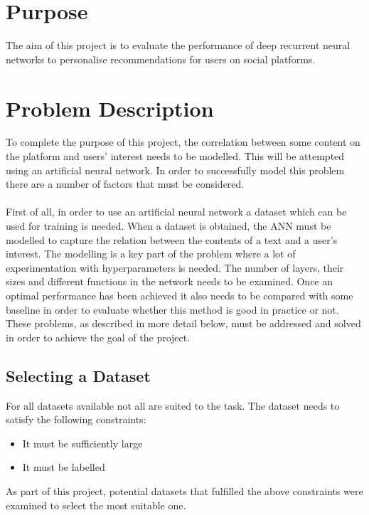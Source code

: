 \section{Purpose}
The aim of this project is to evaluate the performance of deep recurrent neural networks to personalise recommendations for users on social platforms.

\section{Problem Description}
To complete the purpose of this project, the correlation between some content on the platform and users' interest needs to be modelled. This will be attempted using an artificial neural network. In order to successfully model this problem there are a number of factors that must be considered.
\\\\
First of all, in order to use an artificial neural network a dataset which can be used for training is needed. When a dataset is obtained, the ANN must be modelled to capture the relation between the contents of a text and a user's interest. The modelling is a key part of the problem where a lot of experimentation with hyperparameters is needed. The number of layers, their sizes and different functions in the network needs to be examined. Once an optimal performance has been achieved it also needs to be compared with some baseline in order to evaluate whether this method is good in practice or not. These problems, as described in more detail below,  must be addressed and solved in order to achieve the goal of the project.

\subsection{Selecting a Dataset}\label{sec:select_dataset}
For all datasets available not all are suited to the task. The dataset needs to satisfy the following constraints: 
\vspace*{0.25cm}
\begin{itemize}
    \item It must be sufficiently large
    \item It must be labelled
\end{itemize}
\vspace*{0.25cm}
As part of this project, potential datasets that fulfilled the above constraints were examined to select the most suitable one.

